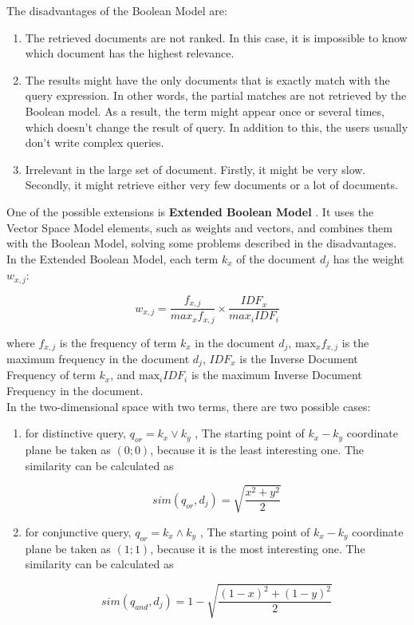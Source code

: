 \documentclass[paper=8.27in:11.69in, 12pt]{scrartcl}
\begin{document}
The disadvantages of the Boolean Model are:

\begin{enumerate}

\item The retrieved documents are not ranked. In this case, it is impossible to know which document has the highest relevance.

\item The results might have the only documents that is exactly match with the query expression. In other words, the partial matches are not retrieved by the Boolean model. As a result, the term might appear once or several times, which doesn't change the result of query. In addition to this, the users usually don't write complex queries.

\item Irrelevant in the large set of document. Firstly, it might be very slow. Secondly, it might retrieve either very few documents or a lot of documents.

\end{enumerate}

One of the possible extensions is \textbf{Extended Boolean Model} \cite{salton1983extended}. It uses the Vector Space Model elements, such as weights and vectors, and combines them with the Boolean Model, solving some problems described in the disadvantages. In the Extended Boolean Model, each term \(k_{x}\) of the document \(d_{j}\) has the weight \(w_{x, j}\):

\[w_{x, j} = \frac{f_{x, j}}{max_{x} f_{x, j}} \times \frac{IDF_{x}}{max_{i} IDF_{i}}\]

where \(f_{x, j}\) is the frequency of term \(k_{x}\) in the document \(d_{j}\), \(\text{max}_{x} f_{x, j}\) is the maximum frequency in the document \(d_{j}\), \(IDF_{x}\) is the Inverse Document Frequency of term \(k_{x}\), and \(\text{max}_{i} IDF_{i}\) is the maximum Inverse Document Frequency in the document.\\

In the two-dimensional space with two terms, there are two possible cases:

\begin{enumerate}

\item for distinctive query, \(q_{or} = k_{x} \vee k_{y}\) , The starting point of \(k_{x}-k_{y}\) coordinate plane be taken as \((0;0)\), because it is the least interesting one. The similarity can be calculated as

\[ sim(q_{or}, d_{j}) = \sqrt{\frac{x^{2} + y^{2}}{2}}\]

\item for conjunctive query, \(q_{or} = k_{x} \wedge k_{y}\) , The starting point of \(k_{x}-k_{y}\) coordinate plane be taken as \((1;1)\), because it is the most interesting one. The similarity can be calculated as

\[ sim(q_{and}, d_{j}) = 1 - \sqrt{\frac{(1-x)^{2} + (1-y)^{2}}{2}}\]

\end{enumerate}
\end{document}
